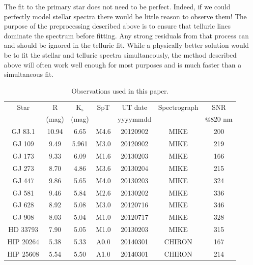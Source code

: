 The fit to the primary star does not need to be perfect. Indeed, if we could perfectly model stellar spectra there would be little reason to observe them! The purpose of the preprocessing described above is to ensure that telluric lines dominate the spectrum before fitting. Any strong residuals from that process can and should be ignored in the telluric fit. While a physically better solution would be to fit the stellar and telluric spectra simultaneously, the method described above will often work well enough  for most purposes and is much faster than a simultaneous fit.


\begin{table}
  \centering
  \caption{Observations used in this paper. }
  \begin{tabular}{|ccccccc|}
  \hline
    Star &    R   &  $\mathrm{K_s}$ & SpT  & UT date  & Spectrograph & SNR    \\
         &  (mag) & (mag)      &      & yyyymmdd &              & @820 nm \\ 
    \hline \hline
    
    GJ 83.1  &  10.94  &  6.65  &  M4.6  &  20120902  &  MIKE  &  200  \\
    GJ 109 &  9.49  &   5.961   & M3.0 & 20120902 & MIKE        & 219 \\
    GJ 173  &  9.33  &  6.09  &  M1.6  &  20130203  &  MIKE  &  166 \\
    GJ 273  &  8.70  &  4.86  &  M3.6  &  20130204  &  MIKE  &  215\\
    GJ 447  &  9.86  &  5.65  &  M4.0  &  20130203  &  MIKE  &  324 \\
    GJ 581  &  9.46  &  5.84  &  M2.6  &  20130202  &  MIKE  &  336 \\
    GJ 628 &  8.92  &  5.08  &  M3.0  &  20120716  &  MIKE  &  346 \\
    GJ 908  &  8.03  &  5.04  &  M1.0  &  20120717  &  MIKE  &  328 \\
    HD 33793  &  7.90  &  5.05  &  M1.0  & 20130203  &  MIKE  &  315 \\
    HIP 20264  &  5.38  &  5.33 &  A0.0  &  20140301  &  CHIRON  &  167 \\
    HIP 25608  &  5.54  &  5.50  &  A1.0  &  20140301  & CHIRON  &  214 \\
    \hline
  
  \end{tabular}
  \label{paper3_tab:sample}

\end{table}



